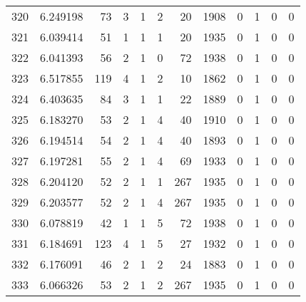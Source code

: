 \begin{tabular}{lrrrrrrrrrrr}
320 &  6.249198 &   73 &      3 &        1 &      2 &              20 &  1908 &               0 &               1 &               0 &               0 \\
321 &  6.039414 &   51 &      1 &        1 &      1 &              20 &  1935 &               0 &               1 &               0 &               0 \\
322 &  6.041393 &   56 &      2 &        1 &      0 &              72 &  1938 &               0 &               1 &               0 &               0 \\
323 &  6.517855 &  119 &      4 &        1 &      2 &              10 &  1862 &               0 &               1 &               0 &               0 \\
324 &  6.403635 &   84 &      3 &        1 &      1 &              22 &  1889 &               0 &               1 &               0 &               0 \\
325 &  6.183270 &   53 &      2 &        1 &      4 &              40 &  1910 &               0 &               1 &               0 &               0 \\
326 &  6.194514 &   54 &      2 &        1 &      4 &              40 &  1893 &               0 &               1 &               0 &               0 \\
327 &  6.197281 &   55 &      2 &        1 &      4 &              69 &  1933 &               0 &               1 &               0 &               0 \\
328 &  6.204120 &   52 &      2 &        1 &      1 &             267 &  1935 &               0 &               1 &               0 &               0 \\
329 &  6.203577 &   52 &      2 &        1 &      4 &             267 &  1935 &               0 &               1 &               0 &               0 \\
330 &  6.078819 &   42 &      1 &        1 &      5 &              72 &  1938 &               0 &               1 &               0 &               0 \\
331 &  6.184691 &  123 &      4 &        1 &      5 &              27 &  1932 &               0 &               1 &               0 &               0 \\
332 &  6.176091 &   46 &      2 &        1 &      2 &              24 &  1883 &               0 &               1 &               0 &               0 \\
333 &  6.066326 &   53 &      2 &        1 &      2 &             267 &  1935 &               0 &               1 &               0 &               0 \\

\end{tabular}
